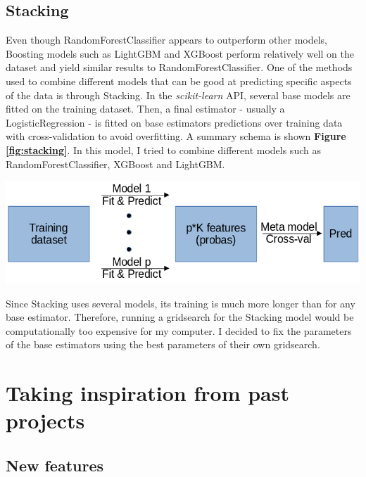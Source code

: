 \documentclass{article}
\newenvironment{Figure}
  {\par\medskip\noindent\minipage{\linewidth}}
  {\endminipage\par\medskip}
\begin{document}
\begin{multicols}{2}
\subsection{Stacking}

Even though RandomForestClassifier appears to outperform other models, Boosting
models such as LightGBM and XGBoost\cite{xgboost} perform relatively well on
the dataset and yield similar results to RandomForestClassifier. One of the methods
used to combine different models that can be good at predicting specific aspects
of the data is through Stacking. In the \textit{scikit-learn} API, several base
models are fitted
on the training dataset. Then, a final estimator - usually a LogisticRegression -
is fitted on base estimators predictions over training data with cross-validation
to avoid overfitting. A summary schema is shown \textbf{Figure \ref{fig:stacking}}.
In this model, I tried to combine different models such as
RandomForestClassifier, XGBoost and LightGBM. 

\begin{Figure}
  \centering
  \captionsetup{type=figure}
  \includegraphics[width=0.75\linewidth]{figures/stacking_schema.png}
  \label{fig:stacking}
\end{Figure}

Since Stacking uses several models, its training is much more longer than for
any base estimator. Therefore, running a gridsearch for the Stacking model would
be computationally too expensive for my computer. I decided to fix the parameters
of the base estimators using the best parameters of their own gridsearch.

\section{Taking inspiration from past projects}

\subsection{New features}


\end{multicols}
\end{document}
